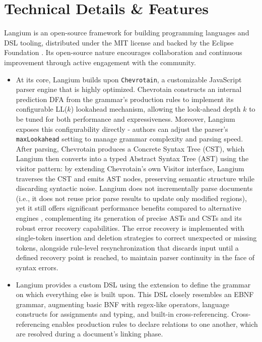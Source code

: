 \section*{Technical Details \& Features}

Langium is an open-source framework for building programming languages and DSL tooling, distributed under the MIT license and backed by the Eclipse Foundation \cite{LangiumGit}.
Its open-source nature encourages collaboration and continuous improvement through active engagement with the community.
\begin{multicols}{2}
  \begin{itemize}
    \item At its core, Langium builds upon \verb|Chevrotain|, a customizable JavaScript parser engine that is highly optimized. Chevrotain constructs an internal prediction DFA \cite{sujew2022enabling}
          from the grammar's production rules to implement its configurable LL($k$) lookahead mechanism, allowing the look-ahead depth $k$ to be tuned for both performance and
          expressiveness. Moreover, Langium exposes this configurability directly - authors can adjust the parser's \verb|maxLookahead| setting to manage grammar complexity and
          parsing speed. After parsing, Chevrotain produces a Concrete Syntax Tree (CST), which Langium then converts into a typed Abstract Syntax Tree (AST) using the visitor pattern:
          by extending Chevrotain's own Visitor interface, Langium traverses the CST and emits AST nodes, preserving semantic structure while discarding syntactic noise.
          Langium does not incrementally parse documents (i.e., it does not reuse prior parse results to update only modified regions), yet it still offers significant performance
          benefits compared to alternative engines \cite{Chevrotain}, complementing its generation of precise ASTs and CSTs and its robust error recovery capabilities. The error recovery is
          implemented with single-token insertion and deletion strategies to correct unexpected or missing tokens, alongside rule-level resynchronization that discards input until a defined
          recovery point is reached, to maintain parser continuity in the face of syntax errors.
    \item Langium provides a custom DSL using the  extension to define the grammar on which everything else is built upon. This DSL closely resembles an EBNF grammar,
          augmenting basic BNF with regex-like operators, language constructs for assignments and typing, and built-in cross-referencing. Cross-referencing enables production rules to declare relations to one another, which are resolved during a document's linking phase.

\end{itemize}
\end{multicols}
